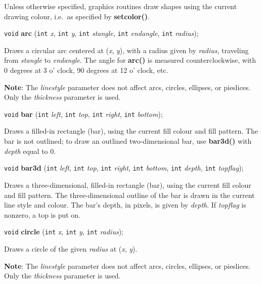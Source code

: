 \documentclass[a4paper,11pt]{article}
\newcommand{\V}{\texttt{void}}      %
\newcommand{\I}{\texttt{int}}       %
\newcommand{\func}[1]{\textbf{#1}}  %
\newcommand{\A}[1]{\emph{#1}}       %
\newenvironment{bgi}
{ %
  \begin{snugshade}
}
{ %
  \end{snugshade}
}
\begin{document}
Unless otherwise specified, graphics routines draw shapes using the
current drawing colour, i.e.\ as specified by \func{setcolor()}.


\begin{bgi}
  \V{} \func{arc} (\I{} \A{x}, \I{} \A{y}, \I{} \A{stangle}, \I{}
  \A{endangle}, \I{} \A{radius});
\end{bgi}

Draws a circular arc centered at (\A{x}, \A{y}), with a radius given
by \A{radius}, traveling from \A{stangle} to \A{endangle}. The angle
for \func{arc()} is measured counterclockwise, with 0 degrees at 3 o'
clock, 90 degrees at 12 o' clock, etc.

\textbf{Note}: The \A{linestyle} parameter does not affect arcs,
circles, ellipses, or pie\-slices. Only the \A{thickness} parameter is
used.


\begin{bgi}
\V{} \func{bar} (\I{} \A{left}, \I{} \A{top}, \I{} \A{right}, \I{}
\A{bottom});
\end{bgi}

Draws a filled-in rectangle (bar), using the current fill colour and
fill pattern. The bar is not outlined; to draw an outlined
two-dimensional bar, use \func{bar3d()} with \A{depth} equal to 0.


\begin{bgi}
\V{} \func{bar3d} (\I{} \A{left}, \I{} \A{top}, \I{} \A{right}, \I{}
\A{bottom}, \I{} \A{depth}, \I{} \A{topflag});
\end{bgi}

Draws a three-dimensional, filled-in rectangle (bar), using the
current fill colour and fill pattern. The three-dimensional outline of
the bar is drawn in the current line style and colour. The bar's
depth, in pixels, is given by \A{depth}. If \A{topflag} is nonzero, a
top is put on.


\begin{bgi}
\V{} \func{circle} (\I{} \A{x}, \I{} \A{y}, \I{} \A{radius});
\end{bgi}

Draws a circle of the given \A{radius} at (\A{x}, \A{y}).

\textbf{Note}: The \A{linestyle} parameter does not affect arcs,
circles, ellipses, or pie\-slices. Only the \A{thickness} parameter is
used.
\end{document}
